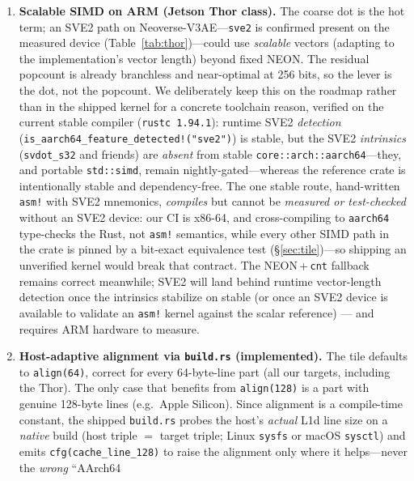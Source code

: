 \documentclass[11pt]{article}
\theoremstyle{plain}
\theoremstyle{definition}
\begin{document}
\begin{enumerate}[leftmargin=1.6em,itemsep=2pt]
  \item \textbf{Scalable SIMD on ARM (Jetson Thor class).} The coarse dot is
    the hot term; an SVE2 path on Neoverse-V3AE---\texttt{sve2} is confirmed
    present on the measured device (Table~\ref{tab:thor})---could use
    \emph{scalable} vectors (adapting to the implementation's vector length)
    beyond fixed NEON. The residual popcount is already branchless and
    near-optimal at 256 bits, so the lever is the dot, not the popcount. We
    deliberately keep this on the roadmap rather than in the shipped kernel for
    a concrete toolchain reason, verified on the current stable compiler
    (\texttt{rustc 1.94.1}): runtime SVE2 \emph{detection}
    (\texttt{is\_aarch64\_feature\_detected!("sve2")}) is stable, but the SVE2
    \emph{intrinsics} (\texttt{svdot\_s32} and friends) are \emph{absent} from
    stable \texttt{core::arch::aarch64}---they, and portable \texttt{std::simd},
    remain nightly-gated---whereas the reference crate is intentionally stable
    and dependency-free. The one stable route, hand-written \texttt{asm!} with
    SVE2 mnemonics, \emph{compiles} but cannot be \emph{measured or
    test-checked} without an SVE2 device: our CI is x86-64, and cross-compiling
    to \texttt{aarch64} type-checks the Rust, not \texttt{asm!} semantics, while
    every other SIMD path in the crate is pinned by a bit-exact equivalence test
    (\S\ref{sec:tile})---so shipping an unverified kernel would break that
    contract. The NEON\,+\,\texttt{cnt} fallback remains correct meanwhile; SVE2
    will land behind runtime vector-length detection once the intrinsics
    stabilize on stable (or once an SVE2 device is available to validate an
    \texttt{asm!} kernel against the scalar reference) --- and requires ARM
    hardware to measure.
  \item \textbf{Host-adaptive alignment via \texttt{build.rs} (implemented).}
    The tile defaults to \texttt{align(64)}, correct for every 64-byte-line
    part (all our targets, including the Thor). The only case that benefits
    from \texttt{align(128)} is a part with genuine 128-byte lines (e.g.\ Apple
    Silicon). Since alignment is a compile-time constant, the shipped
    \texttt{build.rs} probes the host's \emph{actual} L1d line size on a
    \emph{native} build (host triple $=$ target triple; Linux \texttt{sysfs} or
    macOS \texttt{sysctl}) and emits \texttt{cfg(cache\_line\_128)} to raise the
    alignment only where it helps---never the \emph{wrong} ``AArch64

\end{enumerate}
\end{document}
